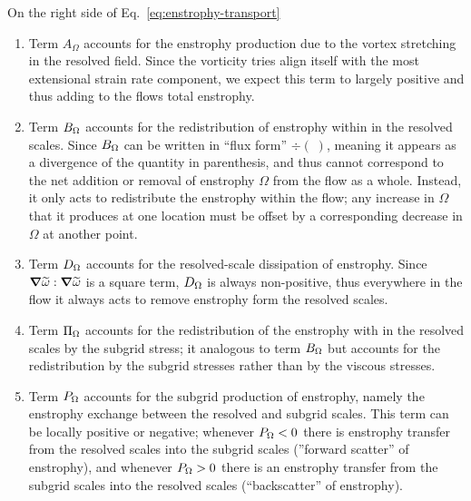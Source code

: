On the right side of Eq.~\ref{eq:enstrophy-transport}
\begin{enumerate}
    \item   
        Term $A_{\Omega}$ accounts for the enstrophy production due to the vortex stretching in the
        resolved field. Since the vorticity tries align itself  with the most extensional strain
        rate component, we expect this term to largely positive and thus adding to the flows total
        enstrophy.
        
    \item
        Term $B_{\Omega}$ accounts for the redistribution of enstrophy within in the resolved
        scales. Since $B_{\Omega}$ can be written in ``flux form'' $\div{(\;)}$, meaning it appears
        as a divergence of the quantity in parenthesis, and thus cannot correspond to the net
        addition or removal of enstrophy $\Omega$ from the flow as a whole. Instead, it only acts
        to redistribute the enstrophy within the flow; any increase in $\Omega$ that it produces at
        one location must be offset by a corresponding decrease in $\Omega$ at another point.   

    \item
        Term $D_{\Omega}$ accounts for the resolved-scale dissipation of enstrophy. Since 
        $\grad{\widetilde{\omega}}: \grad{\widetilde{\omega}}$ is a square term, $D_{\Omega}$ is always
        non-positive, thus everywhere in the flow it always acts to remove enstrophy form the
        resolved scales.
       
    \item
        Term $\Pi_{\Omega}$ accounts for the redistribution of the enstrophy with in the resolved scales
        by the subgrid stress; it analogous to term $B_{\Omega}$ but accounts for the redistribution by
        the subgrid stresses rather than by the viscous stresses.

    \item
        Term $P_{\Omega}$ accounts for the subgrid production of enstrophy, namely the enstrophy
        exchange between the resolved and subgrid scales. This term can be locally positive or
        negative; whenever $P_{\Omega} < 0 $ there is enstrophy transfer from the resolved scales into
        the subgrid scales (''forward scatter'' of enstrophy), and whenever $P_{\Omega} >0$ there is an
        enstrophy transfer from the subgrid scales into the resolved scales (``backscatter'' of
        enstrophy).
        
\end{enumerate}
